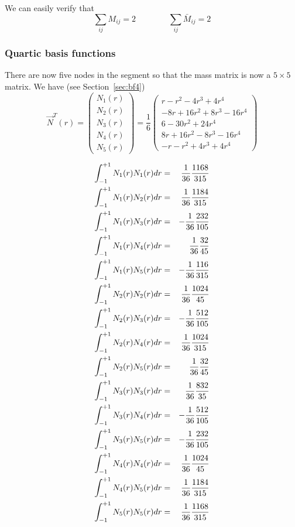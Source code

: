 We can easily verify that
\[
\sum_{ij} M_{ij} = 2
\qquad
\qquad
\sum_{ij} \bar{M}_{ij} = 2
\]


\subsubsection{Quartic basis functions}
There are now five nodes in the segment so that the mass matrix 
is now a $5\times5$ matrix. We have (see Section~\ref{sec:bf4}) 
\begin{equation}
{\vec N}^T(r) = 
\left(
\begin{array}{c}
N_1(r) \\ 
N_2(r) \\ 
N_3(r) \\ 
N_4(r) \\ 
N_5(r) 
\end{array}
\right)
=
\frac{1}{6}
\left(
\begin{array}{c}
  r- r^2 -4r^3 +4r^4 \\
  -8r+16 r^2 +8r^3 -16 r^4  \\
6 -30r^2+24r^4   \\
  8r+16 r^2 -8r^3 -16 r^4  \\
  -r- r^2 +4r^3 +4r^4
\end{array}
\right)
\end{equation}


\begin{eqnarray}
\int_{-1}^{+1} N_1(r) N_1(r) dr &=& \frac{1}{36}\frac{1168}{315} \nonumber\\ 
\int_{-1}^{+1} N_1(r) N_2(r) dr &=& \frac{1}{36}\frac{1184}{315} \nonumber\\ 
\int_{-1}^{+1} N_1(r) N_3(r) dr &=&-\frac{1}{36}\frac{232}{105}  \nonumber\\ 
\int_{-1}^{+1} N_1(r) N_4(r) dr &=& \frac{1}{36}\frac{32}{45}    \nonumber\\ 
\int_{-1}^{+1} N_1(r) N_5(r) dr &=&-\frac{1}{36}\frac{116}{315}  \nonumber\\ 
\int_{-1}^{+1} N_2(r) N_2(r) dr &=& \frac{1}{36}\frac{1024}{45}  \nonumber\\ 
\int_{-1}^{+1} N_2(r) N_3(r) dr &=&-\frac{1}{36}\frac{512}{105}  \nonumber\\ 
\int_{-1}^{+1} N_2(r) N_4(r) dr &=& \frac{1}{36}\frac{1024}{315} \nonumber\\ 
\int_{-1}^{+1} N_2(r) N_5(r) dr &=& \frac{1}{36}\frac{32}{45}    \nonumber\\ 
\int_{-1}^{+1} N_3(r) N_3(r) dr &=& \frac{1}{36}\frac{832}{35}    \nonumber\\ 
\int_{-1}^{+1} N_3(r) N_4(r) dr &=& -\frac{1}{36}\frac{512}{105}    \nonumber\\ 
\int_{-1}^{+1} N_3(r) N_5(r) dr &=& -\frac{1}{36}\frac{232}{105}    \nonumber\\ 
\int_{-1}^{+1} N_4(r) N_4(r) dr &=& \frac{1}{36}\frac{1024}{45}    \nonumber\\ 
\int_{-1}^{+1} N_4(r) N_5(r) dr &=& \frac{1}{36}\frac{1184}{315}    \nonumber\\ 
\int_{-1}^{+1} N_5(r) N_5(r) dr &=& \frac{1}{36}\frac{1168}{315}    
\end{eqnarray}


